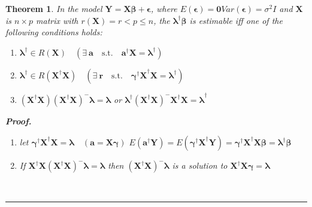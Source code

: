 \documentclass{article}
\newtheorem{theorem}{Theorem}
\newenvironment{proof}[1][Proof]{\noindent\textbf{#1.} }{\ \rule{0.5em}{0.5em}}
\begin{document}
\begin{theorem}
In the model $\mathbf{Y=X\beta +\epsilon }$, where $E\left( \mathbf{\epsilon 
}\right) =\mathbf{0}$\quad $Var\left( \mathbf{\epsilon }\right) =\sigma
^{2}I $ and $\mathbf{X}$ is $n\times p$ matrix with $r\left( \mathbf{X}%
\right) =r<p\leq n$, the $\mathbf{\lambda }^{\dagger }\mathbf{\beta }$ is
estimable iff one of the following conditions holds:

\begin{enumerate}
\item $\mathbf{\lambda }^{\dagger }\in R\left( \mathbf{X}\right) \quad
\left( \exists \ \mathbf{a}\quad \text{s.t.}\quad \mathbf{a}^{\dagger }%
\mathbf{X=\lambda }^{\dagger }\right) $

\item $\mathbf{\lambda }^{\dagger }\in R\left( \mathbf{X^{\dagger }X}\right)
\quad \left( \exists \ \mathbf{r}\quad \text{s.t.}\quad \mathbf{\gamma
^{\dagger }X}^{\dagger }\mathbf{X=\lambda }^{\dagger }\right) $

\item $\left( \mathbf{X^{\dagger }X}\right) \left( \mathbf{X^{\dagger }X}%
\right) ^{-}\mathbf{\lambda =\lambda }$ or $\mathbf{\lambda }^{\dagger
}\left( \mathbf{X^{\dagger }X}\right) ^{-}\mathbf{X^{\dagger }X=\lambda }%
^{\dagger }$
\end{enumerate}

\begin{proof}
\begin{enumerate}
\item[2.] let $\mathbf{\gamma ^{\dagger }X}^{\dagger }\mathbf{X=\lambda }%
\quad \left( \mathbf{a=X\gamma }\right) $\newline
$E\left( \mathbf{a}^{\dagger }\mathbf{Y}\right) =E\left( \mathbf{\gamma
^{\dagger }X}^{\dagger }\mathbf{Y}\right) =\mathbf{\gamma ^{\dagger }X}%
^{\dagger }\mathbf{X\beta =\lambda }^{\dagger }\mathbf{\beta }$\newline
{}

\item[3.] If $\mathbf{X}^{\dagger }\mathbf{X}\left( \mathbf{X}^{\dagger }%
\mathbf{X}\right) ^{-}\mathbf{\lambda =\lambda }$\newline
then $\left( \mathbf{X}^{\dagger }\mathbf{X}\right) ^{-}\mathbf{\lambda }$
is a solution to $\mathbf{X}^{\dagger }\mathbf{X\gamma =\lambda }$
\end{enumerate}
\end{proof}
\end{theorem}
\end{document}
